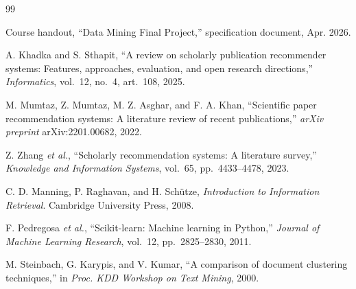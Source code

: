 \documentclass[conference]{IEEEtran}
\begin{document}
\begin{thebibliography}{99}

Course handout, ``Data Mining Final Project,'' specification document, Apr. 2026.

A. Khadka and S. Sthapit, ``A review on scholarly publication recommender systems: Features, approaches, evaluation, and open research directions,'' \emph{Informatics}, vol.~12, no.~4, art.~108, 2025.

M. Mumtaz, Z. Mumtaz, M. Z. Asghar, and F. A. Khan, ``Scientific paper recommendation systems: A literature review of recent publications,'' \emph{arXiv preprint} arXiv:2201.00682, 2022.

Z. Zhang \emph{et al.}, ``Scholarly recommendation systems: A literature survey,'' \emph{Knowledge and Information Systems}, vol.~65, pp.~4433--4478, 2023.

C. D. Manning, P. Raghavan, and H. Schütze, \emph{Introduction to Information Retrieval}. Cambridge University Press, 2008.

F. Pedregosa \emph{et al.}, ``Scikit-learn: Machine learning in Python,'' \emph{Journal of Machine Learning Research}, vol.~12, pp.~2825--2830, 2011.

M. Steinbach, G. Karypis, and V. Kumar, ``A comparison of document clustering techniques,'' in \emph{Proc. KDD Workshop on Text Mining}, 2000.

\end{thebibliography}
\end{document}
